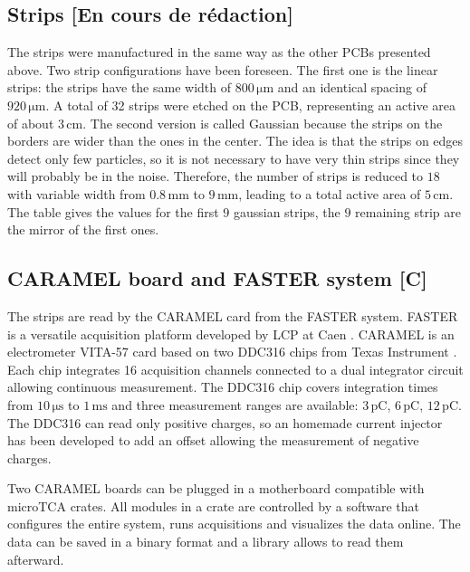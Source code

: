 \begin{refsection}
  \subsection{Strips [En cours de rédaction]}
  The strips were manufactured in the same way as the other PCBs presented above. Two strip configurations have been foreseen. The first one is the linear strips: the strips have the same width of $800\,\mathrm{\mu m}$ and an identical spacing of $920\,\mathrm{\mu m}$. A total of 32 strips were etched on the PCB, representing an active area of about $3\,\mathrm{cm}$. The second version is called Gaussian because the strips on the borders are wider than the ones in the center. The idea is that the strips on edges detect only few particles, so it is not necessary to have very thin strips since they will probably be in the noise. Therefore, the number of strips is reduced to $18$ with variable width from $0.8\,\mathrm{mm}$ to $9\,\mathrm{mm}$, leading to a total active area of $5\,\mathrm{cm}$. The table gives the values for the first $9$ gaussian strips, the $9$ remaining strip are the mirror of the first ones.

  

  \subsection{CARAMEL board and FASTER system [C]}
  
  The strips are read by the CARAMEL card \cite{caramel2013} from the FASTER system. FASTER is a versatile  acquisition platform developed by LCP at Caen \cite{faster2013}. CARAMEL is an electrometer VITA-57 card based on two DDC316 chips from Texas Instrument \cite{ddc316}. Each chip integrates 16 acquisition channels connected to a dual integrator circuit allowing continuous measurement. The DDC316 chip covers integration times from $10\,\mathrm{\mu s}$ to $1\,\mathrm{ms}$ and three measurement ranges are available: $3\,\mathrm{pC}$, $6\,\mathrm{pC}$, $12\,\mathrm{pC}$. The DDC316 can read only positive charges, so an homemade current injector has been developed to add an offset allowing the measurement of negative charges.
  

  Two CARAMEL boards can be plugged in a motherboard compatible with microTCA crates. All modules in a crate are controlled by a software that configures the entire system, runs acquisitions and visualizes \cite{rhb2012} the data online. The data can be saved in a binary format and a library allows to read them afterward.


\end{refsection}
